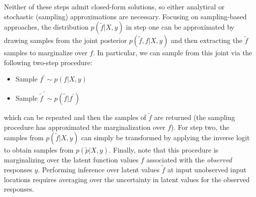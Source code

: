 \documentclass[12pt]{article}
\begin{document}
Neither of these steps admit closed-form solutions, so either analytical or stochastic (sampling) approximations are necessary. Focusing on sampling-based approaches, the 
distribution $p(\tilde{f}|X, y)$ in step one can be approximated by drawing samples from the joint posterior $p(\tilde{f}, f|X, y)$ and then extracting the $\tilde{f}$ samples to 
marginalize over $f$. In particular, we can sample from this joint via the following two-step procedure: 
\begin{itemize}
\item Sample $f^\prime \sim p(f|X, y)$
\item Sample $\tilde{f}^\prime \sim p(\tilde{f}|f^\prime)$
\end{itemize}
which can be repeated and then the samples of $\tilde{f}$ are returned (the sampling procedure has approximated the marginalization over $f$). 
For step two, the samples from $p(\tilde{f}|X, y)$ can simply be transformed by applying the inverse logit to obtain samples from $p(\tilde{p}|X, y)$. Finally, note 
that this procedure is marginalizing over the latent function values $f$ associated with the \textit{observed} responses $y$. Performing inference over
latent values $\tilde{f}$ at input unobserved input locations requires averaging over the uncertainty in latent values for the observed responses. 
\end{document}
